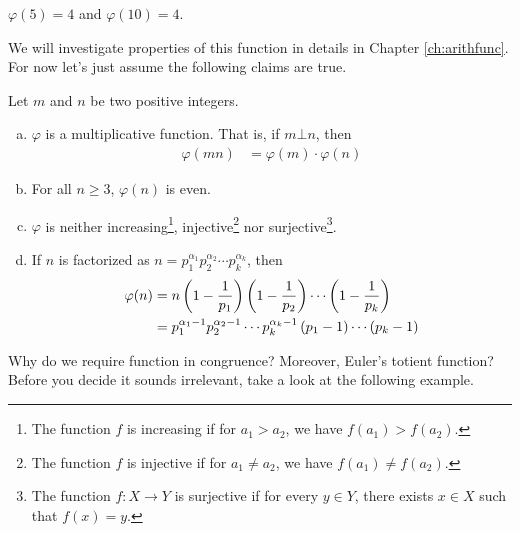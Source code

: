 	\begin{example}
		$\varphi(5)=4$ and $\varphi(10)=4$.
	\end{example}
We will investigate properties of this function in details in Chapter \ref{ch:arithfunc}. For now let's just assume the following claims are true.
\begin{proposition}\label{prop:phiproperties}
	Let $m$ and $n$ be two positive integers.
	\begin{enumerate}[(a)]
		\item $\varphi$ is a multiplicative function. That is, if $m \bot n$, then
		\begin{align*}
			\varphi(mn)
				& =\varphi(m) \cdot \varphi (n)
		\end{align*}
		\item For all $n \geq 3$, $\varphi(n)$ is even.
		\item $\varphi$ is neither increasing\footnote{The function $f$ is increasing if for $a_1 >a_2$, we have  $f(a_1) > f(a_2)$.}, injective\footnote{The function $f$ is injective if for $a_1 \neq a_2$, we have $f(a_1) \neq f(a_2)$.} nor surjective\footnote{The function $f:X \to Y$ is surjective if for every $y \in Y$, there exists $x \in X$ such that $f(x)=y$.}.
		\item If $n$ is factorized as $n= p_1^{\alpha_1} p_2^{\alpha_2} \cdots p_k^{\alpha_k}$, then
			\begin{align*}
				\varphi(n)
					& = n \left(1 - \frac{1}{p_1}\right)\left(1 - \frac{1}{p_2}\right)\cdots\left(1 - \frac{1}{p_k}\right)\\
					& = p_1^{\alpha_1-1} p_2^{\alpha_2-1} \cdots p_k^{\alpha_k-1} \left(p_1 -1\right)\cdots \left(p_k -1\right)
			\end{align*}
	\end{enumerate}
\end{proposition}


Why do we require function in congruence? Moreover, Euler's totient function? Before you decide it sounds irrelevant, take a look at the following example.

